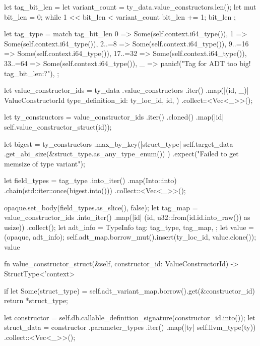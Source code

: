 \documentclass[
  oneside,
  english,
  coorientadorbanca,
  noabntexcite
]{ufsc-thesis-rn46-2019}
\begin{document}
\begin{rustcode}
{{        let tag_bit_len = {
            let variant_count = ty_data.value_constructors.len();
            let mut bit_len = 0;
            while 1 << bit_len < variant_count {
                bit_len += 1;
            }
            bit_len
        };

        let tag_type = match tag_bit_len {
            0 => Some(self.context.i64_type()),
            1 => Some(self.context.i64_type()),
            2..=8 => Some(self.context.i64_type()),
            9..=16 => Some(self.context.i64_type()),
            17..=32 => Some(self.context.i64_type()),
            33..=64 => Some(self.context.i64_type()),
            _ => panic!("Tag for ADT too big! {tag_bit_len:?}"),
        };

        let value_constructor_ids = ty_data
            .value_constructors
            .iter()
            .map(|(id, _)| ValueConstructorId {
                type_definition_id: ty_loc_id,
                id,
            })
            .collect::<Vec<_>>();

        let ty_constructors = value_constructor_ids
            .iter()
            .cloned()
            .map(|id| self.value_constructor_struct(id));

        let bigest = ty_constructors
            .max_by_key(|struct_type| {
                self.target_data
                    .get_abi_size(&struct_type.as_any_type_enum())
            })
            .expect("Failed to get memsize of type variant");

        let field_types = tag_type
            .into_iter()
            .map(Into::into)
            .chain(std::iter::once(bigest.into()))
            .collect::<Vec<_>>();

        opaque.set_body(field_types.as_slice(), false);
        let tag_map = value_constructor_ids
            .into_iter()
            .map(|id| (id, u32::from(id.id.into_raw()) as usize))
            .collect();
        let adt_info = TypeInfo {
            tag: tag_type,
            tag_map,
        };
        let value = (opaque, adt_info);
        self.adt_map.borrow_mut().insert(ty_loc_id, value.clone());
        value
    }

    fn value_constructor_struct(&self, constructor_id: ValueConstructorId) -> StructType<'context> {
        if let Some(struct_type) = self.adt_variant_map.borrow().get(&constructor_id) {
            return *struct_type;
        }

        let constructor = self.db.callable_definition_signature(constructor_id.into());
        let struct_data = constructor
            .parameter_types
            .iter()
            .map(|ty| self.llvm_type(ty))
            .collect::<Vec<_>>();

}}
\end{rustcode}
\end{document}
